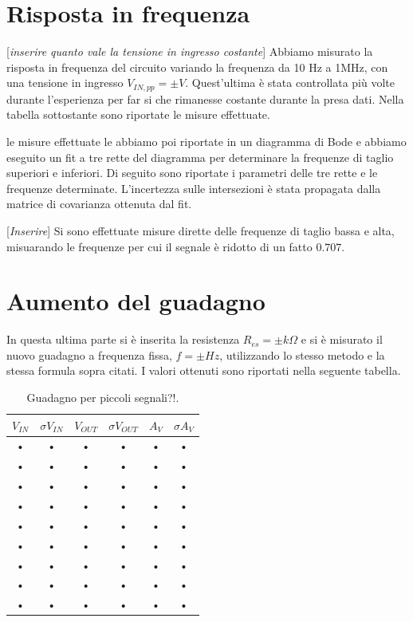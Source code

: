 \documentclass[10pt,a4paper]{article}
\newcommand{\rem}[1]{[\emph{#1}]}
\begin{document}
\section{Risposta in frequenza}
\rem{inserire quanto vale la tensione in ingresso costante}
Abbiamo misurato la risposta in frequenza del circuito variando la frequenza da 10 Hz a 1MHz, con una tensione in ingresso $V_{IN,pp}= \pm V$. Quest'ultima è stata controllata più volte durante l'esperienza per far si che rimanesse costante durante la presa dati. Nella tabella sottostante sono riportate le misure effettuate.

le misure effettuate le abbiamo poi riportate in un diagramma di Bode e abbiamo eseguito un fit a tre rette del diagramma per determinare la frequenze di taglio superiori e inferiori. Di seguito sono riportate i parametri delle tre rette e le frequenze determinate. L'incertezza sulle intersezioni è stata propagata dalla matrice di covarianza ottenuta dal fit.

\rem{Inserire}
Si sono effettuate misure dirette delle frequenze di taglio bassa e alta, misuarando le frequenze per cui il segnale è ridotto di un fatto $0.707$.

\section{Aumento del guadagno}
In questa ultima parte si è inserita la resistenza $R_{es}= \pm k\Omega$ e si è misurato il nuovo guadagno a frequenza fissa, $f= \pm Hz$, utilizzando lo stesso metodo e la stessa formula sopra citati. I valori ottenuti sono riportati nella seguente tabella.

\begin{table}[h]
\centering
\begin{tabular}{|c|c|c|c|c|c|}
\hline 
$V_{IN}$ & $\sigma V_{IN}$ & $V_{OUT}$ & $\sigma V_{OUT}$ & $A_V$ & $\sigma A_V$ \\ 
\hline 
• & • & • & • & • & • \\ 
\hline 
• & • & • & • & • & • \\ 
\hline 
• & • & • & • & • & • \\ 
\hline 
• & • & • & • & • & • \\ 
\hline 
• & • & • & • & • & • \\ 
\hline 
• & • & • & • & • & • \\ 
\hline 
• & • & • & • & • & • \\ 
\hline 
• & • & • & • & • & • \\ 
\hline 
• & • & • & • & • & • \\ 
\hline 
\end{tabular}
\caption{Guadagno per piccoli segnali?!.}
\end{table}
\end{document}
